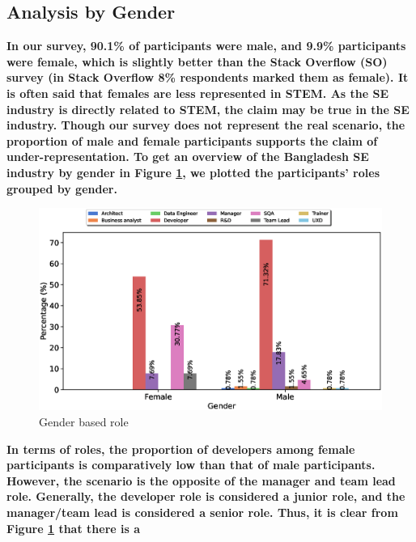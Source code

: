 \subsection{Analysis by Gender}
\label{analysis by gender}

\bf{In our survey, 90.1\% of participants were male, and 9.9\% participants were
female, which is slightly better than the Stack Overflow (SO) survey
\citep{StackoverflowSurvey2017,StackoverflowSurvey2018,StackoverflowSurvey2019,StackoverflowSurvey2020}
(in Stack Overflow 8\% respondents marked them as female).} It is often said that
females are less represented in STEM. As the SE industry is directly related to
STEM, the claim may be true in the SE industry. Though our survey does not
represent the real scenario, the proportion of male and female participants
supports the claim of under-representation. To get an overview of the Bangladesh
SE industry by gender in Figure \ref{fig:gender and role}, we plotted the
participants' roles grouped by gender.
\begin{figure}[h] \centering
 \includegraphics[scale=0.4]{Figures/Gender_and_Role}
 \caption{Gender based role}
 \label{fig:gender and role}
\end{figure}
\bf{In terms of roles, the proportion of developers among female participants is
comparatively low than that of male participants. However, the scenario is the
opposite of the manager and team lead role.} Generally, the developer role is
considered a junior role, and the manager/team lead is considered a senior role.
Thus, it is clear from Figure \ref{fig:gender and role} that there is a
